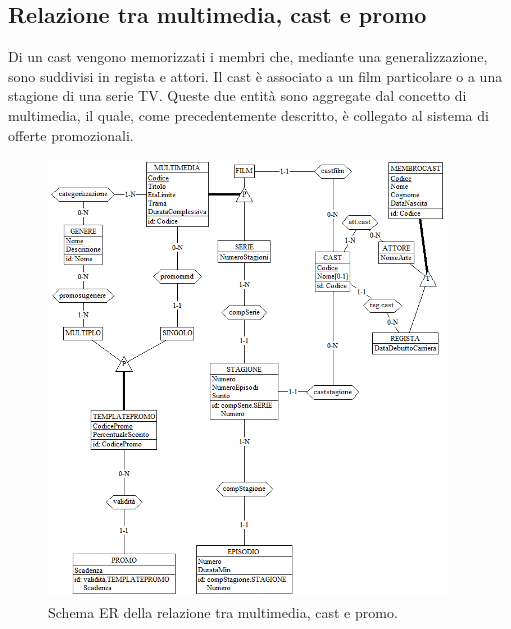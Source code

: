 \documentclass[a4paper,12pt]{report}
\begin{document}
\subsection{Relazione tra multimedia, cast e promo}
Di un cast vengono memorizzati i membri che, mediante una generalizzazione, sono suddivisi in regista e attori. Il cast è associato a un film particolare o a una stagione di una serie TV. Queste due entità sono aggregate dal concetto di multimedia, il quale, come precedentemente descritto, è collegato al sistema di offerte promozionali.
\begin{figure}[H]
	\centering
	\includegraphics[width=300pt]{ER/multimediacastpromo.png}
	\caption{Schema ER della relazione tra multimedia, cast e promo.}
\end{figure}
\end{document}
